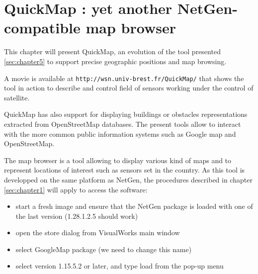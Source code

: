 
\chapter{QuickMap : yet another NetGen-compatible map browser}

\label{sec:chapter5bis}

This chapter will present QuickMap, an evolution of the tool presented \ref{sec:chapter5}
to support precise geographic positions and map browsing. 

A movie is available at {\tt http://wsn.univ-brest.fr/QuickMap/} that shows
the tool in action to describe and control field of sensors working
under the control of satellite.

QuickMap has also support for displaying 
buildings or obstacles representations extracted from OpenStreetMap databases. 
The present tools allow to interact with the more common public information systems 
such as Google map and OpenStreetMap. 

The map browser is a tool allowing to display various kind of maps and to represent 
locations of interest such as sensors set in the country. 
As this tool is developped on the same platform as NetGen, the procedures described 
in chapter \ref{sec:chapter1} will apply to access the software: 
\begin{itemize}
\item start a fresh image and ensure that the NetGen package is loaded with one of the last 
version (1.28.1.2.5 should work)
\item open the store dialog from VisualWorks main window
\item select GoogleMap package (we need to change this name)
\item select version 1.15.5.2 or later, and type load from the pop-up menu
\end{itemize}
